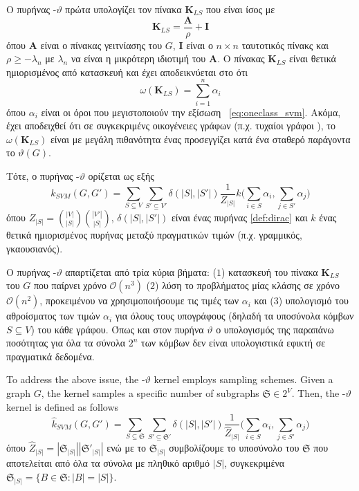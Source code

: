 Ο πυρήνας -$\vartheta$ πρώτα υπολογίζει τον πίνακα $\mathbf{K}_{LS}$ που είναι ίσος με
\begin{equation}
    \mathbf{K}_{LS} = \frac{\mathbf{A}}{\rho} + \mathbf{I}
\end{equation}
όπου $\mathbf{A}$ είναι ο πίνακας γειτνίασης του $G$, $\mathbf{I}$ είναι ο $n \times n$ ταυτοτικός πίνακς και $\rho \geq -\lambda_n$ με $\lambda_n$ να είναι η μικρότερη ιδιοτιμή του $\mathbf{A}$.
Ο πίνακας $\mathbf{K}_{LS}$ είναι θετικά ημιορισμένος από κατασκευή και έχει αποδεικνύεται στο \cite{jethava2013lovasz} ότι
\begin{equation}
    \omega(\mathbf{K}_{LS}) = \sum_{i=1}^n \alpha_i
\end{equation}
όπου $\alpha_i$ είναι οι όροι που μεγιστοποιούν την εξίσωση ~\ref{eq:oneclass_svm}. 
Ακόμα, έχει αποδειχθεί ότι σε συγκεκριμένς οικογένειες γράφων (π.χ. τυχαίοι γράφοι ), το  $\omega(\mathbf{K}_{LS})$ είναι με μεγάλη πιθανότητα ένας προσεγγίζει κατά ένα σταθερό παράγοντα το $\vartheta(G)$.

Τότε, ο πυρήνας -$\vartheta$ ορίζεται ως εξής
\begin{equation}
    k_{SVM}(G, G') = \sum_{S \subseteq V} \sum_{S' \subseteq V'} \delta(|S|, |S'|) \frac{1}{Z_{|S|}} k \Big(\sum_{i \in S} \alpha_i, \sum_{j \in S'} \alpha_j \Big)
\end{equation}
όπου $Z_{|S|} = \binom{|V|}{|S|} \binom{|V'|}{|S|}$, $\delta(|S|, |S'|)$ είναι ένας πυρήνας  \ref{def:dirac} και $k$ ένας θετικά ημιορισμένος πυρήνας μεταξύ πραγματικών τιμών (π.χ. γραμμικός, γκαουσιανός).

Ο πυρήνας -$\vartheta$ απαρτίζεται από τρία κύρια βήματα: ($1$) κατασκευή του πίνακα $\mathbf{K}_{LS}$ του $G$ που παίρνει χρόνο $\mathcal{O}(n^3)$ ($2$) λύση το προβλήματος  μίας κλάσης σε χρόνο $\mathcal{O}(n^2)$, προκειμένου να χρησιμοποιήσουμε τις τιμές των $\alpha_i$ και ($3$) υπολογισμό του αθροίσματος των τιμών $\alpha_i$ για όλους τους υπογράφους (δηλαδή τα υποσύνολα κόμβων $S \subseteq V$) του κάθε γράφου.
Όπως και στον πυρήνα  $\vartheta$ ο υπολογισμός της παραπάνω ποσότητας για όλα τα σύνολα $2^n$ των κόμβων δεν είναι υπολογιστικά εφικτή σε πραγματικά δεδομένα.

To address the above issue, the -$\vartheta$ kernel employs sampling schemes.
Given a graph $G$, the kernel samples a specific number of subgraphs $\mathfrak{S} \in 2^V$.
Then, the -$\vartheta$ kernel is defined as follows
\begin{equation*}
    \hat{k}_{SVM}(G, G') = \sum_{S \subseteq \mathfrak{S}} \sum_{S' \subseteq \mathfrak{S}'} \delta(|S|, |S'|) \frac{1}{\hat{Z}_{|S|}} \Big(\sum_{i \in S} \alpha_i, \sum_{j \in S'} \alpha_j \Big)
\end{equation*}
όπου $\hat{Z}_{|S|} = |\mathfrak{S}_{|S|}| |\mathfrak{S}'_{|S|}|$ ενώ με το $\mathfrak{S}_{|S|}$ συμβολίζουμε το υποσύνολο του $\mathfrak{S}$ που αποτελείται από όλα τα σύνολα με πληθικό αριθμό $|S|$, συγκεκριμένα $\mathfrak{S}_{|S|} = \{ B \in \mathfrak{S} : |B| = |S| \}$.

